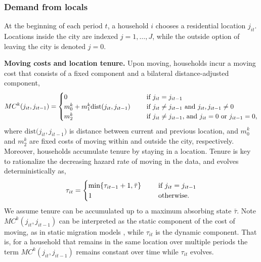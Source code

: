 \documentclass[11pt]{article}
\newcommand{\Paragraph}{\vspace{0.1cm}\noindent\textbf}
\begin{document}
\subsubsection{Demand from locals}\label{sec:demand_locals}

At the beginning of each period $t$, a household $i$ chooses a residential location $j_{it}$. Locations inside the city are indexed $j=1,\dots,J$, while the outside option of leaving the city is denoted $j=0$. 

\Paragraph{Moving costs and location tenure.} Upon moving, households incur a moving cost that consists of a fixed component and a bilateral distance-adjusted component, 
\begin{align*}
   MC^k(j_{it},j_{it-1})=
   \begin{cases}
   0 &\hspace{5mm}\text{if }   j_{it} = j_{it-1} \\
   m_0^k + m_1^k \text{dist($j_{it},j_{it-1}$)} &\hspace{5mm}\text{if }   j_{it} \neq j_{it-1}\text{ and } j_{it},j_{it-1}\neq 0\\
   m_2^k &\hspace{5mm}\text{if }  j_{it} \neq j_{it-1}\text{, and } j_{it} = 0 \text{ or } j_{it-1} = 0,
\end{cases}  
\end{align*} 
where $\text{dist($j_{it},j_{it-1}$)}$ is distance between current and previous location, and $m_0^k$ and $m_2^k$ are fixed costs of moving within and outside the city, respectively. Moreover, households
accumulate tenure by staying in a location. Tenure is key to rationalize the decreasing hazard rate of moving in the data, and evolves deterministically as,
\begin{align*}
     \tau_{it} =\begin{cases} \min\{\tau_{it-1}+1,\bar{\tau}\} &\hspace{5mm}\text{if } j_{it} = j_{it-1} \\
    1  &\hspace{5mm}\text{otherwise}.
    \end{cases}
\end{align*}
We assume tenure can be accumulated up to a maximum absorbing state $\bar{\tau}$. Note $MC^k(j_{it},j_{it-1})$ can be interpreted as the static component of the cost of moving, as in static migration models \citep{bryan2019aggregate}, while $\tau_{it}$ is the dynamic component. That is, for a household that remains in the same location over multiple periods the term $MC^k(j_{it},j_{it-1})$ remains constant over time while $\tau_{it}$ evolves.
\end{document}

